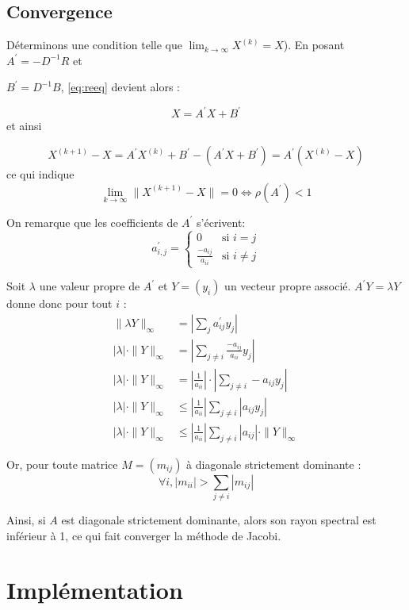 \documentclass[11pt, a4paper]{article}
\begin{document}
\newpage
\subsection{Convergence}

Déterminons une condition telle que \(\lim_{k \to \infty} X^{(k)} = X\)).
En posant \( A^\prime = -D^{-1}R\) et

\( B^\prime = D^{-1}B \),
\eqref{eq:reeq} devient alors :

\[
    X = A^\prime X + B^\prime
\]
et ainsi

\[
    X^{(k+1)} - X = A^\prime X^{(k)} + B^\prime - (A^\prime X + B^\prime)
    =  A^\prime (X^{(k)} - X)
\]
ce qui indique
\[
    \lim_{k \to \infty} \| X^{(k+1)} - X \| = 0 \Leftrightarrow \rho(A^\prime) < 1
\]

On remarque que les coefficients de \( A^\prime \) s'écrivent:
\[
    a^\prime_{i,j} = \left\{
        \begin{array}{lr}
            0 & \text{si } i = j \\
            \frac{-a_{ij}}{a_{ii}} & \text{si } i \neq j
        \end{array}
    \right.
\]

Soit \( \lambda \) une valeur propre de \( A^\prime \) et \( Y = (y_i) \)
un vecteur propre associé.
\( A^\prime Y = \lambda Y \) donne donc pour tout \(i\) :
\begin{align*}
    \|\lambda Y\|_\infty &= | \sum_j a^\prime_{ij} y_j | \\
    |\lambda| \cdot\| Y\|_\infty &= | \sum_{j \neq i} \frac{-a_{ij}}{a_{ii}} y_j | \\
    |\lambda| \cdot\| Y\|_\infty &= |\frac{1}{a_{ii}}| \cdot | \sum_{j \neq i} -a_{ij} y_j| \\
    |\lambda| \cdot\| Y\|_\infty &\leq |\frac{1}{a_{ii}}| \sum_{j \neq i} |a_{ij} y_j|\\
    |\lambda| \cdot\| Y\|_\infty &\leq |\frac{1}{a_{ii}}| \sum_{j \neq i} |a_{ij}| \cdot\| Y\|_\infty
\end{align*}

Or, pour toute matrice \( M = (m_{ij}) \) à diagonale strictement dominante :
\[
    \forall i, |m_{ii}| > \sum_{j \neq i} |m_{ij}|
\]

Ainsi, si \( A \) est diagonale strictement dominante, alors son rayon spectral est inférieur à 1, ce qui fait converger la méthode de Jacobi.

\newpage
\section{Implémentation}
\end{document}
